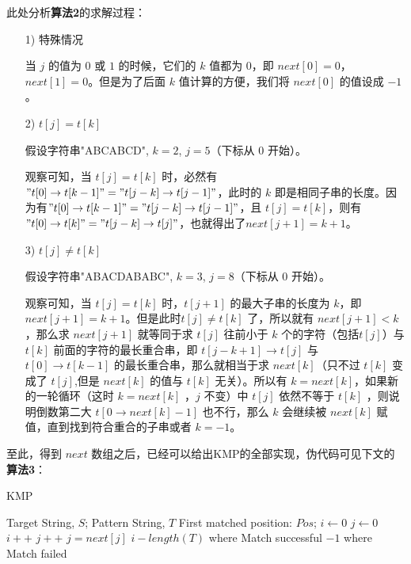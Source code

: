 \documentclass[UTF8]{ctexart}
\begin{document}
此处分析\textbf{算法2}的求解过程：\par
\begin{itemize}
  \item [1)] 特殊情况 \par 
	当 $j$ 的值为 $0$ 或 $1$ 的时候，它们的 $k$ 值都为 $0$，即 $next[0] = 0$，$next[1] =0$。但是为了后面 $k$ 值计算的方便，我们将 $next[0]$ 的值设成 $-1$。
 \item [2)] $t[j]=t[k]$ \par
	假设字符串"\textcolor[rgb]{1,0,0}{AB}C\textcolor[rgb]{0,0,1}{AB}CD", $k=2$, $j=5$（下标从 $0$ 开始）。 
	\par 观察可知，当 $t[j] = t[k]$ 时，必然有$"t[0] \to t[k-1]" = " t[j-k] \to t[j-1]"$，此时的 $k$ 即是相同子串的长度。因为有$"t[0] \to t[k-1]" = " t[j-k] \to t[j-1]"$，且 $t[j] = t[k]$，则有$"t[0] \to t[k]" = " t[j-k] \to t[j]"$，也就得出了$next[j+1]=k+1$。
 \item [3)] $t[j] \ne t[k]$ \par
	假设字符串"\textcolor[rgb]{1,0,0}{ABA}CDA\textcolor[rgb]{0,0,1}{BAB}C", $k=3$, $j=8$（下标从 $0$ 开始）。
	\par 观察可知，当 $t[j] = t[k]$ 时，$t[j+1]$ 的最大子串的长度为 $k$，即 $next[j+1] = k+1$。但是此时$t[j] \ne t[k]$ 了，所以就有 $next[j+1] < k$，那么求 $next[j+1]$ 就等同于求 $t[j]$ 往前小于 $k$ 个的字符（包括$t[j]$）与 $t[k]$ 前面的字符的最长重合串，即 $t[j-k+1] \to t[j]$ 与 $t[0] \to t[k-1]$ 的最长重合串，那么就相当于求 $next[k]$（只不过 $t[k]$ 变成了 $t[j]$,但是 $next[k]$ 的值与 $t[k]$ 无关）。所以有 $k = next[k]$，如果新的一轮循环（这时 $k = next[k]$ ，$j$ 不变）中 $t[j]$ 依然不等于 $t[k]$ ，则说明倒数第二大 $t[0 \to next[k]-1]$ 也不行，那么 $k$ 会继续被 $next[k]$ 赋值，直到找到符合重合的子串或者 $k = -1$。
\end{itemize}
至此，得到 $next$ 数组之后，已经可以给出KMP的全部实现，伪代码可见下文的\textbf{算法3}：

\begin{algorithm}
\caption{KMP}  
\label{alg:KMP}  
\begin{algorithmic} [1]
    \Require  
      Target String, $S$;
	  Pattern String, $T$
    \Ensure  
      First matched position: $Pos$;  
		\State $i \gets 0$
		\State $j \gets 0$  
		\State {}
				\State $i++$
				\State $j++$
			\Else 
				\State $j=next[j]$
			\EndIf
		 \EndWhile
				\State \Return $i-length(T)$ where Match successful
			\Else 
				\State \Return $-1$ where Match failed
			\EndIf
	\EndFunction  
\end{algorithmic}
\end{algorithm}
\end{document}
